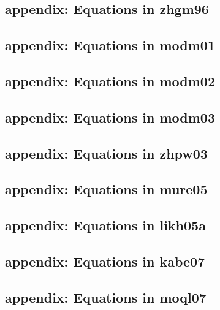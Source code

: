 \newpage
\subsection{appendix: Equations in zhgm96\label{ve_zhgm96}} 

\newpage
\subsection{appendix: Equations in modm01\label{ve_modm01}} 

\newpage
\subsection{appendix: Equations in modm02\label{ve_modm02}} 

\newpage
\subsection{appendix: Equations in modm03\label{ve_modm03}} 

\newpage
\subsection{appendix: Equations in zhpw03\label{ve_zhpw03}} 

\newpage
\subsection{appendix: Equations in mure05\label{ve_mure05}} 

\newpage
\subsection{appendix: Equations in likh05a\label{ve_likh05}} 

\newpage
\subsection{appendix: Equations in kabe07\label{ve_kabe07}} 

\newpage
\subsection{appendix: Equations in moql07\label{ve_moql07}} 

\newpage
